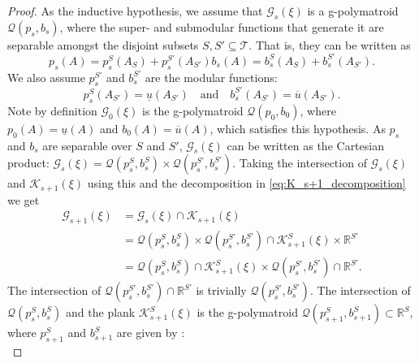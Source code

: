 \begin{proof}
As the inductive hypothesis, we assume that $ \mathcal{G}_s(\xi)$ is a g-polymatroid $\mathcal{Q}(p_s, b_s)$, where the super- and submodular functions that generate it are separable amongst the disjoint subsets $S, S' \subseteq \mathcal{T}$. That is, they can be written as 
\begin{subequations}\label{eq:inductive_hype}
    \begin{equation}
        p_s(A) = p^S_s(A_S) + p^{S'}_s(A_{S'})
    \end{equation}
    \begin{equation} 
        b_s(A) = b^S_s(A_S) + b^{S'}_s(A_{S'}).
    \end{equation}
\end{subequations}
We also assume $p^{S'}_s$ and $ b^{S'}_s$ are the modular functions:
\begin{equation}\label{eq:modular_functions}
        p^{S}_s(A_{S'}) = \underline{u}(A_{S'}) \quad \text{and} \quad b^{S'}_s(A_{S'}) = \overline{u}(A_{S'}).
\end{equation}
Note by definition $ \mathcal{G}_0(\xi)$ is the g-polymatroid $\mathcal{Q}(p_0, b_0)$, where $p_0(A) = \underline{u}(A)$ and $b_0(A) = \overline{u}(A)$, which satisfies this hypothesis.
As $p_s$ and $b_s$ are separable over $S$ and $S'$, $\mathcal{G}_s(\xi)$ can be written as the Cartesian product:
$\mathcal{G}_s(\xi) = \mathcal{Q}(p^S_s,b^S_s) \times \mathcal{Q}(p^{S'}_s,b^{S'}_s)$.
Taking the intersection of $ \mathcal{G}_s(\xi)$ and $\mathcal{K}_{s+1}(\xi)$ using this and the decomposition in \eqref{eq:K_s+1_decomposition} we get
\begin{align*}
     \mathcal{G}_{s+1}(\xi)  &=   \mathcal{G}_s(\xi)  \cap \mathcal{K}_{s+1}(\xi)\\
                                &= \mathcal{Q}(p^S_s,b^S_s) \times \mathcal{Q}(p^{S'}_s,b^{S'}_s) \cap \mathcal{K}^S_{s+1}(\xi) \times \mathbb{R}^{S'}\\
                            &= \mathcal{Q}(p^S_s,b^S_s) \cap \mathcal{K}^S_{s+1}(\xi) \times\mathcal{Q}(p^{S'}_s,b^{S'}_s)  \cap \mathbb{R}^{S'}.
\end{align*}
The intersection of $\mathcal{Q}(p^{S'}_s,b^{S'}_s)  \cap \mathbb{R}^{S'}$ is trivially $\mathcal{Q}(p^{S'}_s,b^{S'}_s)$.
The intersection of $\mathcal{Q}(p^S_s,b^S_s)$ and the plank $\mathcal{K}^S_{s+1}(\xi)$ is the g-polymatroid $ \mathcal{Q}(p^S_{s+1},b^S_{s+1}) \subset \mathbb{R}^S$, where $p^S_{s+1}$ and $b^S_{s+1}$ are given by \cite[Theorem 14.2.14]{Frank2011ConnectionsOptimization}:
\begin{subequations}\label{eq:intersection_plank}

\end{subequations}
\end{proof}
